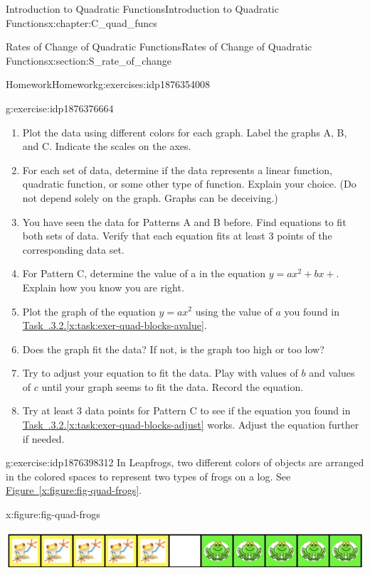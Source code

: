 \documentclass[oneside,10pt,]{book}
\newcommand{\xreffont}{\relax}
\numberwithin{equation}{chapter}
\begin{document}
\begin{chapterptx}{Introduction to Quadratic Functions}{}{Introduction to Quadratic Functions}{}{}{x:chapter:C_quad_funcs}
\begin{sectionptx}{Rates of Change of Quadratic Functions}{}{Rates of Change of Quadratic Functions}{}{}{x:section:S_rate_of_change}
\begin{exercises-subsection}{Homework}{}{Homework}{}{}{g:exercises:idp1876354008}
\begin{divisionexercise}{2}{}{}{g:exercise:idp1876376664}
\begin{enumerate}[font=\bfseries,label=(\alph*),ref=\alph*]
\begin{tableptx}{\textbf{}}{x:table:tbl-quad-block}{}
{\begin{tabular}{Accccccc}
\end{tabular}
}%
\end{tableptx}%
\item{}Plot the data using different colors for each graph. Label the graphs A, B, and C. Indicate the scales on the axes.%
\item{}For each set of data, determine if the data represents a linear function, quadratic function, or some other type of function. Explain your choice. (Do not depend solely on the graph. Graphs can be deceiving.)%
\item{}You have seen the data for Patterns A and B before. Find equations to fit both sets of data. Verify that each equation fits at least 3 points of the corresponding data set.%
\item\label{x:task:exer-quad-blocks-avalue}For Pattern C, determine the value of a in the equation \(y = ax^2 + bx + \). Explain how you know you are right.%
\item{}Plot the graph of the equation \(y = ax^2\) using the value of \(a\) you found in \hyperref[x:task:exer-quad-blocks-avalue]{Task~{\xreffont 4.4.3.2}.{\xreffont\ref{x:task:exer-quad-blocks-avalue}}}.%
\item{}Does the graph fit the data? If not, is the graph too high or too low?%
\item\label{x:task:exer-quad-blocks-adjust}Try to adjust your equation to fit the data. Play with values of \(b\) and values of \(c\) until your graph seems to fit the data. Record the equation.%
\item\label{x:task:exer-quad-blocks-try}Try at least 3 data points for Pattern C to see if the equation you found in \hyperref[x:task:exer-quad-blocks-adjust]{Task~{\xreffont 4.4.3.2}.{\xreffont\ref{x:task:exer-quad-blocks-adjust}}} works. Adjust the equation further if needed.%
\end{enumerate}
\end{divisionexercise}%
\begin{divisionexercise}{3}{}{}{g:exercise:idp1876398312}%
In Leapfrogs,\footnotemark{} two different colors of objects are arranged in the colored spaces to represent two types of frogs on a log. See \hyperref[x:figure:fig-quad-frogs]{Figure~{\xreffont\ref{x:figure:fig-quad-frogs}}}.%
\begin{figureptx}{}{x:figure:fig-quad-frogs}{}%
\begin{image}{0.05}{0.9}{0.05}%
\includegraphics[width=\linewidth]{external/quad-frogs.pdf}

\end{image}
\end{figureptx}
\end{divisionexercise}
\end{exercises-subsection}
\end{sectionptx}
\end{chapterptx}
\end{document}
